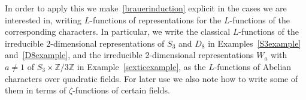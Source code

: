 \documentclass{amsart}
\begin{document}
In order to apply this we make~\eqref{brauerinduction} explicit in the cases we are interested in,
writing {$L$-functions{\futurelet{}}} of representations for the {$L$-functions{\futurelet{}}} of the corresponding characters.
In particular, we write the classical {$L$-functions{\futurelet{}}} of the irreducible 2-dimensional representations
of $ S_3 $ and $ D_8 $ in Examples~\ref{S3example} and~\ref{D8example}, and the irreducible 2-dimensional
representations $ W_a $ with $ a \ne 1 $ of $ S_3 \times {\mathbb Z}/3{\mathbb Z}$ in Example~\ref{sexticexample}, as
the {$L$-functions{\futurelet{}}} of Abelian characters over quadratic fields. 
For later use we also note how to write some of them in terms of $ {\zeta} $-functions of certain fields.
\end{document}
